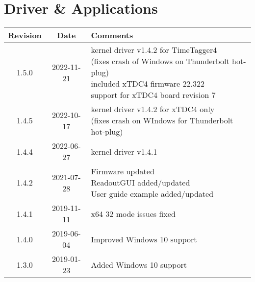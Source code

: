 \section{Driver \& Applications}
\begin{tabularx}{\textwidth}{|c|c|X|}
    \hline
    Revision & Date & Comments\\
    \hline\hline
    \hline
    \hypertarget{drvrev}{1.5.0} & 2022-11-21 &
    \makecell[l] {
        kernel driver v1.4.2 for TimeTagger4\\*
        (fixes crash of Windows on Thunderbolt hot-plug)\\*
        included xTDC4 firmware 22.322 \\*
        support for xTDC4 board revision 7
    }\\
    \hline
    {1.4.5} & 2022-10-17 &
    \makecell[l] {
        kernel driver v1.4.2 for xTDC4 only\\* 
        (fixes crash on WIndows for Thunderbolt hot-plug)\\*
    }\\
    \hline
    {1.4.4} & 2022-06-27 &
        kernel driver v1.4.1\\
    \hline
    1.4.2 & 2021-07-28 &
    \makecell[l]{
        Firmware updated \\*
        ReadoutGUI added/updated \\*
        User guide example added/updated \\*
    }\\
    \hline
    {1.4.1} & 2019-11-11 & x64 32 mode issues fixed\\
    \hline
    {1.4.0} & 2019-06-04 & Improved Windows 10 support\\
    \hline
    {1.3.0} & 2019-01-23 & Added Windows 10 support\\
    \hline
\end{tabularx}
